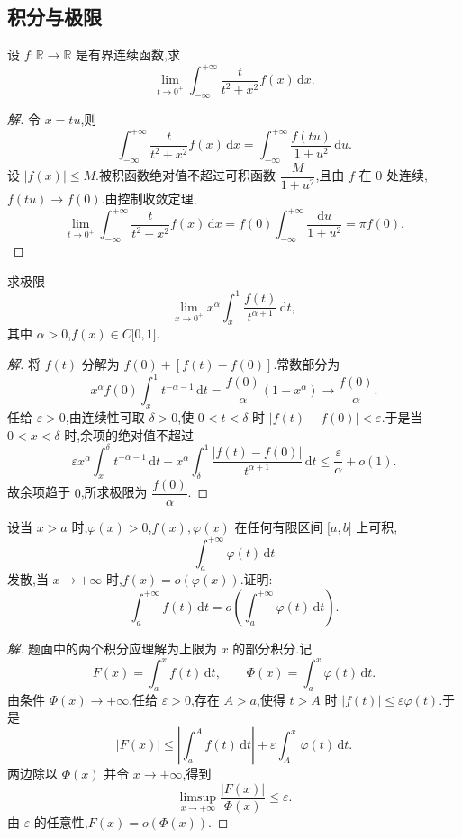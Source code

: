 \documentclass[../../数学分析培优讲义(答案版).tex]{subfiles}
\begin{document}
\subsection{积分与极限}

\begin{example}
设 $f:\mathbb{R}\to\mathbb{R}$ 是有界连续函数,求
\[
    \lim\limits_{t\to0^+}\int_{-\infty}^{+\infty}\dfrac{t}{t^2+x^2}f(x)\,\mathrm{d}x.
\]
\end{example}

\begin{proof}[解]
令 $x=tu$,则
\[
    \int_{-\infty}^{+\infty}\dfrac{t}{t^2+x^2}f(x)\,\mathrm{d}x
    =\int_{-\infty}^{+\infty}\dfrac{f(tu)}{1+u^2}\,\mathrm{d}u.
\]
设 $|f(x)|\leq M$.被积函数绝对值不超过可积函数
$\dfrac{M}{1+u^2}$,且由 $f$ 在 $0$ 处连续,$f(tu)\to f(0)$.由控制收敛定理,
\[
    \lim\limits_{t\to0^+}\int_{-\infty}^{+\infty}
    \dfrac{t}{t^2+x^2}f(x)\,\mathrm{d}x
    =f(0)\int_{-\infty}^{+\infty}\dfrac{\mathrm{d}u}{1+u^2}
    =\pi f(0).
\]
\end{proof}

\begin{example}
求极限
\[
    \lim\limits_{x\to0^+}x^\alpha\int_x^1\dfrac{f(t)}{t^{\alpha+1}}\,\mathrm{d}t,
\]
其中 $\alpha>0$,$f(x)\in C\lbrack 0,1\rbrack$.
\end{example}

\begin{proof}[解]
将 $f(t)$ 分解为 $f(0)+[f(t)-f(0)]$.常数部分为
\[
    x^\alpha f(0)\int_x^1t^{-\alpha-1}\,\mathrm{d}t
    =\dfrac{f(0)}{\alpha}(1-x^\alpha)
    \longrightarrow\dfrac{f(0)}{\alpha}.
\]
任给 $\varepsilon>0$,由连续性可取 $\delta>0$,使 $0<t<\delta$ 时
$|f(t)-f(0)|<\varepsilon$.于是当 $0<x<\delta$ 时,余项的绝对值不超过
\[
    \varepsilon x^\alpha\int_x^\delta t^{-\alpha-1}\,\mathrm{d}t
    +x^\alpha\int_\delta^1\dfrac{|f(t)-f(0)|}{t^{\alpha+1}}\,\mathrm{d}t
    \leq\dfrac{\varepsilon}{\alpha}+o(1).
\]
故余项趋于 $0$,所求极限为 $\dfrac{f(0)}{\alpha}$.
\end{proof}

\begin{example}
设当 $x>a$ 时,$\varphi(x)>0$,$f(x),\varphi(x)$ 在任何有限区间 $\lbrack a,b\rbrack$ 上可积,
\[
    \int_a^{+\infty}\varphi(t)\,\mathrm{d}t
\]
发散,当 $x\to+\infty$ 时,$f(x)=o(\varphi(x))$.证明:
\[
    \int_a^{+\infty}f(t)\,\mathrm{d}t
    =o\left(\int_a^{+\infty}\varphi(t)\,\mathrm{d}t\right).
\]
\end{example}

\begin{proof}[解]
题面中的两个积分应理解为上限为 $x$ 的部分积分.记
\[
    F(x)=\int_a^xf(t)\,\mathrm{d}t,
    \qquad
    \Phi(x)=\int_a^x\varphi(t)\,\mathrm{d}t.
\]
由条件 $\Phi(x)\to+\infty$.任给 $\varepsilon>0$,存在 $A>a$,使得
$t>A$ 时 $|f(t)|\leq\varepsilon\varphi(t)$.于是
\[
    |F(x)|\leq\left|\int_a^Af(t)\,\mathrm{d}t\right|
    +\varepsilon\int_A^x\varphi(t)\,\mathrm{d}t.
\]
两边除以 $\Phi(x)$ 并令 $x\to+\infty$,得到
\[
    \limsup\limits_{x\to+\infty}\dfrac{|F(x)|}{\Phi(x)}\leq\varepsilon.
\]
由 $\varepsilon$ 的任意性,$F(x)=o(\Phi(x))$.
\end{proof}
\end{document}
